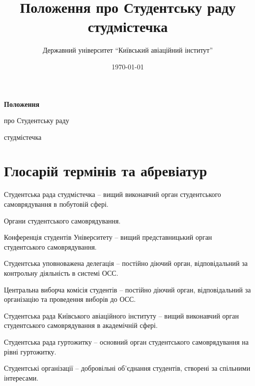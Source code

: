 \documentclass[12pt, a4paper]{article}
\title{Положення про Студентську раду студмістечка}
\author{Державний університет ``Київський авіаційний інститут''}
\date{\today} %
\begin{document}
\begin{titlepage}
    \centering
    \vspace*{\fill} %

    {\Huge\bfseries Положення}\par %
    \vspace{1em} %
    {\LARGE про Студентську раду}\par %
    \vspace{0.5em} %
    {\large студмістечка}\par %

    \vspace*{\fill} %
\end{titlepage}

\section*{Глосарій термінів та абревіатур}
\begin{description}[leftmargin=3cm,style=nextline]
    \item[СР СМ] Студентська рада студмістечка -- вищий виконавчий орган студентського самоврядування в побутовій сфері.
    \item[ОСС] Органи студентського самоврядування.
    \item[КСУ] Конференція студентів Університету -- вищий представницький орган студентського самоврядування.
    \item[СУД] Студентська уповноважена делегація -- постійно діючий орган, відповідальний за контрольну діяльність в системі ОСС.
    \item[ЦВКс] Центральна виборча комісія студентів -- постійно діючий орган, відповідальний за організацію та проведення виборів до ОСС.
    \item[СР КАІ] Студентська рада Київського авіаційного інституту -- вищий виконавчий орган студентського самоврядування в академічній сфері.
    \item[СРГ] Студентська рада гуртожитку -- основний орган студентського самоврядування на рівні гуртожитку.
    \item[СО] Студентські організації -- добровільні об'єднання студентів, створені за спільними інтересами.
\end{description}
\newpage

\renewcommand{\contentsname}{Зміст}
\tableofcontents
\newpage










\end{document}
